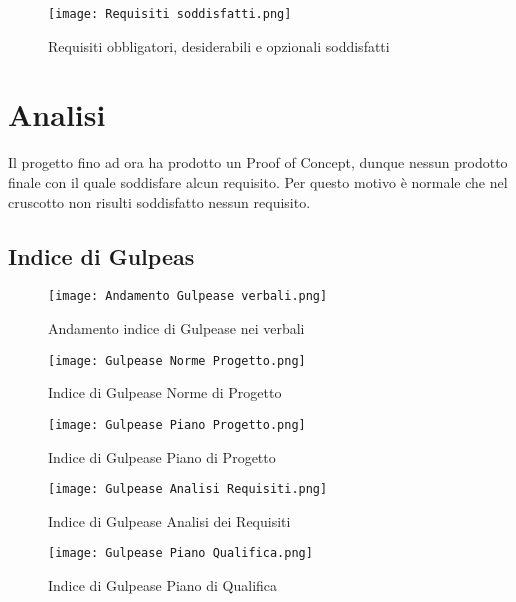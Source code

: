 \begin{figure}[h] 
    \centering
    \texttt{[image: Requisiti soddisfatti.png]}
    \caption{Requisiti obbligatori, desiderabili e opzionali soddisfatti} 
    \label{fig: Requisiti soddisfatti}
\end{figure}

\section*{Analisi}
Il progetto fino ad ora ha prodotto un Proof of Concept, dunque nessun prodotto finale con il quale soddisfare alcun requisito.
Per questo motivo è normale che nel cruscotto non risulti soddisfatto nessun requisito.

\newpage

\subsection{Indice di Gulpeas}
\label{subsec:Indice di Gulpease}

\begin{figure}[h!] 
    \centering
    \texttt{[image: Andamento Gulpease verbali.png]}
    \caption{Andamento indice di Gulpease nei verbali} 
    \label{fig: Andamento Gulpease verbali}
\end{figure}

\begin{figure}[h!]
    \centering

    \begin{minipage}{.4\textwidth}
        \centering
        \texttt{[image: Gulpease Norme Progetto.png]}
        \caption{}{Indice di Gulpease Norme di Progetto}
        \label{fig:Gulpease Norme Progetto}
    \end{minipage}%
    \begin{minipage}{.4\textwidth}
        \centering
        \texttt{[image: Gulpease Piano Progetto.png]}
        \caption{}{Indice di Gulpease Piano di Progetto}
        \label{fig:Gulpease Piano Progetto}
    \end{minipage}

\end{figure}

\begin{figure}[H]
    \centering

    \begin{minipage}{.4\textwidth}
        \centering
        \texttt{[image: Gulpease Analisi Requisiti.png]}
        \caption{}{Indice di Gulpease Analisi dei Requisiti}
        \label{fig:Gulpease Analisi Requisiti}
    \end{minipage}%
    \begin{minipage}{.4\textwidth}
        \centering
        \texttt{[image: Gulpease Piano Qualifica.png]}
        \caption{}{Indice di Gulpease Piano di Qualifica}
        \label{fig:Gulpease Piano Qualifica}
    \end{minipage}

\end{figure}


